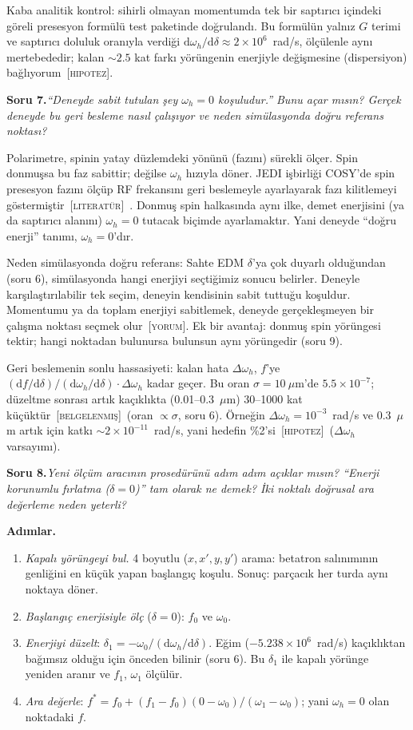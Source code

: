 \documentclass[11pt,a4paper]{article}
\newcommand{\BEL}{\textsc{[belgelenmiş]}}
\newcommand{\YOR}{\textsc{[yorum]}}
\newcommand{\HIP}{\textsc{[hipotez]}}
\newcommand{\LIT}{\textsc{[literatür]}}
\newcounter{soru}
\newcommand{\soru}[2]{%
  \par\medskip\noindent\textbf{Soru #1.}\enspace\textit{#2}\par\nopagebreak\smallskip}
\begin{document}
Kaba analitik kontrol: sihirli olmayan momentumda tek bir saptırıcı içindeki göreli presesyon formülü test
paketinde doğrulandı. Bu formülün yalnız $G$ terimi ve saptırıcı doluluk oranıyla verdiği
$\mathrm{d}\omega_h/\mathrm{d}\delta\approx2\times10^{6}$~rad/s, ölçülenle aynı mertebededir; kalan
$\sim2.5$ kat farkı yörüngenin enerjiyle değişmesine (dispersiyon) bağlıyorum~\HIP.

\soru{7}{``Deneyde sabit tutulan şey $\omega_h=0$ koşuludur.'' Bunu açar mısın? Gerçek deneyde bu geri
besleme nasıl çalışıyor ve neden simülasyonda doğru referans noktası?}

Polarimetre, spinin yatay düzlemdeki yönünü (fazını) sürekli ölçer. Spin donmuşsa bu faz sabittir; değilse
$\omega_h$ hızıyla döner. JEDI işbirliği COSY'de spin presesyon fazını ölçüp RF frekansını geri beslemeyle
ayarlayarak fazı kilitlemeyi göstermiştir~\LIT~\cite{jedi_phaselock}. Donmuş spin halkasında aynı ilke, demet
enerjisini (ya da saptırıcı alanını) $\omega_h=0$ tutacak biçimde ayarlamaktır. Yani deneyde ``doğru
enerji'' tanımı, $\omega_h=0$'dır.

Neden simülasyonda doğru referans: Sahte EDM $\delta$'ya çok duyarlı olduğundan (soru 6), simülasyonda hangi
enerjiyi seçtiğimiz sonucu belirler. Deneyle karşılaştırılabilir tek seçim, deneyin kendisinin sabit
tuttuğu koşuldur. Momentumu ya da toplam enerjiyi sabitlemek, deneyde gerçekleşmeyen bir çalışma noktası
seçmek olur~\YOR. Ek bir avantaj: donmuş spin yörüngesi tektir; hangi noktadan bulunursa bulunsun aynı
yörüngedir (soru 9).

Geri beslemenin sonlu hassasiyeti: kalan hata $\Delta\omega_h$, $f$'ye
$(\mathrm{d}f/\mathrm{d}\delta)/(\mathrm{d}\omega_h/\mathrm{d}\delta)\cdot\Delta\omega_h$ kadar geçer. Bu oran
$\sigma=10~\mu$m'de $5.5\times10^{-7}$; düzeltme sonrası artık kaçıklıkta (0.01--0.3~$\mu$m) 30--1000 kat
küçüktür~\BEL\ (oran $\propto\sigma$, soru 6). Örneğin $\Delta\omega_h=10^{-3}$~rad/s ve 0.3~$\mu$m artık
için katkı $\sim2\times10^{-11}$~rad/s, yani hedefin \%2'si~\HIP\ ($\Delta\omega_h$ varsayımı).

\soru{8}{Yeni ölçüm aracının prosedürünü adım adım açıklar mısın? ``Enerji korunumlu fırlatma
($\delta=0$)'' tam olarak ne demek? İki noktalı doğrusal ara değerleme neden yeterli?}

\textbf{Adımlar.}
\begin{enumerate}[nosep]
\item \emph{Kapalı yörüngeyi bul.} 4 boyutlu ($x,x',y,y'$) arama: betatron salınımının genliğini en küçük
yapan başlangıç koşulu. Sonuç: parçacık her turda aynı noktaya döner.
\item \emph{Başlangıç enerjisiyle ölç} ($\delta=0$): $f_0$ ve $\omega_0$.
\item \emph{Enerjiyi düzelt}: $\delta_1=-\omega_0/(\mathrm{d}\omega_h/\mathrm{d}\delta)$. Eğim
($-5.238\times10^6$~rad/s) kaçıklıktan bağımsız olduğu için önceden bilinir (soru 6). Bu $\delta_1$ ile
kapalı yörünge yeniden aranır ve $f_1$, $\omega_1$ ölçülür.
\item \emph{Ara değerle}: $f^*=f_0+(f_1-f_0)(0-\omega_0)/(\omega_1-\omega_0)$; yani $\omega_h=0$ olan
noktadaki $f$.
\end{enumerate}
\end{document}
